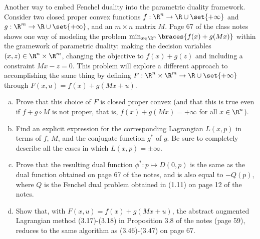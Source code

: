 \documentclass{article}
\theoremstyle{plain}
\theoremstyle{definition}
\theoremstyle{remark}
\begin{document}
\begin{problem}
    {Another way to embed Fenchel duality into the parametric duality framework.}
    Consider two closed proper convex functions $f:\R^n\rightarrow\R\cup\set{+\infty}$ and $g:\R^m\rightarrow\R\cup\set{+\infty}$, and an $m\times n$ matrix $M$. Page 67 of the class notes shows one way of modeling the problem $\min_{x\in\R^n}\braces{f(x)+g(Mx)}$ within the gramework of parametric duality: making the decision variables $(x,z)\in\R^n\times \R^m$, changing the objective to $f(x)+g(z)$ and including a constraint $Mx-z=0$. This problem will explore a different approach to accomplishing the same thing by defining $F:\R^n\times\R^m\rightarrow\R\cup\set{+\infty}$ through $F(x,u)=f(x)+g(Mx+u)$.
    \begin{enumerate}[(a)]
        \item Prove that this choice of $F$ is closed proper convex (and that this is true even if $f+g\circ M$ is not proper, that is, $f(x)+g(Mx)=+\infty$ for all $x\in\R^n$).
        \item Find an explicit expression for the corresponding Lagrangian $L(x,p)$ in terms of $f$, $M$, and the conjugate function $g^*$ of $g$. Be sure to completely describe all the cases in which $L(x,p)=\pm\infty$.
        \item Prove that the resulting dual function $\phi^*:p\mapsto D(0,p)$ is the same as the dual function obtained on page 67 of the notes, and is also equal to $-Q(p)$, where $Q$ is the Fenchel dual problem obtained in (1.11) on page 12 of the notes.
        \item Show that, with $F(x,u)=f(x)+g(Mx+u)$, the abstract augmented Lagrangian method (3.17)-(3.18) in Proposition 3.8 of the notes (page 59), reduces to the same algorithm as (3.46)-(3.47) on page 67.
    \end{enumerate}
\end{problem}
\end{document}
